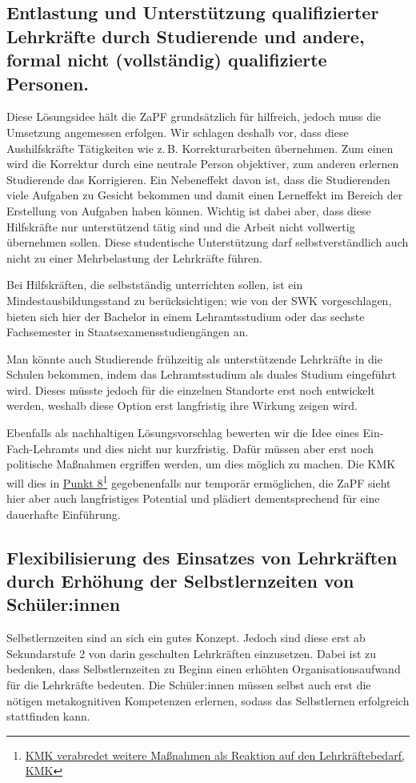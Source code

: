 \documentclass[DIV=calc]{scrartcl}
\begin{document}
\subsection*{Entlastung und Unterstützung qualifizierter Lehrkräfte durch Studierende und andere, formal nicht (vollständig) qualifizierte Personen.}
Diese Lösungsidee hält die ZaPF grundsätzlich für hilfreich, jedoch muss die Umsetzung angemessen erfolgen. Wir schlagen deshalb vor, dass diese Aushilfskräfte Tätigkeiten wie z.\,B. Korrekturarbeiten übernehmen. 
Zum einen wird die Korrektur durch eine neutrale Person objektiver, zum anderen erlernen Studierende das Korrigieren. 
Ein Nebeneffekt davon ist, dass die Studierenden viele Aufgaben zu Gesicht bekommen und damit einen Lerneffekt im Bereich der Erstellung von Aufgaben haben können.
Wichtig ist dabei aber, dass diese Hilfskräfte nur unterstützend tätig sind und die Arbeit nicht vollwertig übernehmen sollen. Diese studentische Unterstützung darf selbstverständlich auch nicht zu einer Mehrbelastung der Lehrkräfte führen.

Bei Hilfskräften, die selbstständig unterrichten sollen, ist ein Mindestausbildungsstand zu berücksichtigen; wie von der SWK vorgeschlagen, bieten sich hier der Bachelor in einem Lehramtsstudium oder das sechste Fachsemester in Staatsexamensstudiengängen an.

Man könnte auch Studierende frühzeitig als unterstützende Lehrkräfte in die Schulen bekommen, indem das Lehramtsstudium als duales Studium eingeführt wird. Dieses müsste jedoch für die einzelnen Standorte erst noch entwickelt werden, weshalb diese Option erst langfristig ihre Wirkung zeigen wird.

Ebenfalls als nachhaltigen Lösungsvorschlag bewerten wir die Idee eines Ein-Fach-Lehramts und dies nicht nur kurzfristig. Dafür müssen aber erst noch politische Maßnahmen ergriffen werden, um dies möglich zu machen. Die KMK will dies in \href{https://www.kmk.org/aktuelles/artikelansicht/kmk-verabredet-weitere-massnahmen-als-reaktion-auf-den-lehrkraeftebedarf.html}{Punkt 8}\footnote{\href{https://www.kmk.org/aktuelles/artikelansicht/kmk-verabredet-weitere-massnahmen-als-reaktion-auf-den-lehrkraeftebedarf.html}{KMK verabredet weitere Maßnahmen als Reaktion auf den Lehrkräftebedarf, KMK}} 
gegebenenfalls nur temporär ermöglichen, die ZaPF sieht hier aber auch langfristiges Potential und plädiert dementsprechend für eine dauerhafte Einführung.


\subsection*{Flexibilisierung des Einsatzes von Lehrkräften durch Erhöhung der Selbstlernzeiten von Schüler:innen}
Selbstlernzeiten sind an sich ein gutes Konzept. Jedoch sind diese erst ab Sekundarstufe 2 von darin geschulten Lehrkräften einzusetzen. Dabei ist zu bedenken, dass Selbstlernzeiten zu Beginn einen erhöhten Organisationsaufwand für die Lehrkräfte bedeuten. Die Schüler:innen müssen selbst auch erst die nötigen metakognitiven Kompetenzen erlernen, sodass das Selbstlernen erfolgreich stattfinden kann.
\end{document}
